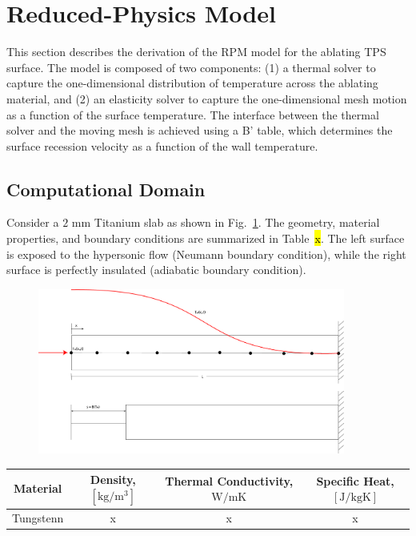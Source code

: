\section{Reduced-Physics Model}

This section describes the derivation of the RPM model for the ablating TPS surface. The model is composed of two components: (1) a thermal solver to capture the one-dimensional distribution of temperature across the ablating material, and (2) an elasticity solver to capture the one-dimensional mesh motion as a function of the surface temperature. The interface between the thermal solver and the moving mesh is achieved using a B' table, which determines the surface recession velocity as a function of the wall temperature.

\subsection{Computational Domain}

Consider a $2$ mm Titanium slab as shown in Fig.~\ref{fig_ablation_domain}. The geometry, material properties, and boundary conditions are summarized in Table~\hl{x}. The left surface is exposed to the hypersonic flow (Neumann boundary condition), while the right surface is perfectly insulated (adiabatic boundary condition). 

\begin{figure}[h]
    \centering
    \includegraphics[width=0.9\textwidth]{./figs/ablation.png}
    \label{fig_ablation_domain}
\end{figure}

\begin{table}[h]
    \begin{tabular}{cccc}
        Material & Density, $[\text{kg}/\text{m}^3]$ & Thermal Conductivity, $\text{W}/{\text{m}\text{K}}$ & Specific Heat, $[\text{J}/\text{kg}\text{K}]$\\
        \hline
        \hline
        Tungstenn & x & x & x\\
        \hline
        \hline
    \end{tabular}
\end{table}

